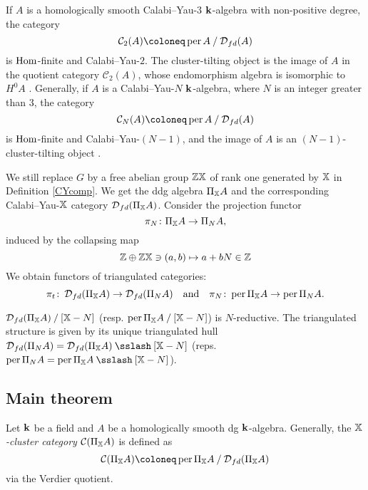 \begin{remark}
  If $A$ is a homologically smooth Calabi--Yau-$3$ $\mathbf{k}$-algebra
  with non-positive degree, the category
  \[ \mathcal{C}_2(A) \coloneq \per A \quot \D_{fd}(A)\]
  is $\operatorname{Hom}$-finite and Calabi--Yau-$2$.
  The cluster-tilting object is the image of $A$
  in the quotient category $\mathcal{C}_2(A)$,
  whose endomorphism algebra is isomorphic to $H^0A$ \cite[Theorem 2.1]{A}.
  Generally, if $A$ is a Calabi--Yau-$N$ $\mathbf{k}$-algebra,
  where $N$ is an integer greater than $3$,
  the category
  \[ \mathcal{C}_N(A) \coloneq \per A \quot \D_{fd}(A)\]
  is $\operatorname{Hom}$-finite and Calabi--Yau-$(N-1)$,
  and the image of $A$ is an $(N-1)$-cluster-tilting object \cite[Theorem 2.2]{Guo}.
\end{remark}
We still replace $G$ by a free abelian group $\mathbb{Z}\mathbb{X}$ of rank one
generated by $\mathbb{X}$ in Definition \ref{CYcomp}.
We get the ddg algebra $\Pi_{\mathbb{X}}A$
and the corresponding Calabi--Yau-$\mathbb{X}$ category $\operatorname{\mathcal{D}}_{fd}(\Pi_{\mathbb{X}}A)$.
Consider the projection functor
\[ \pi_N \colon \Pi_{\mathbb{X}}A \to \Pi_NA, \]
induced by the collapsing map
\[ \mathbb{Z} \oplus \mathbb{Z} \mathbb{X} \ni (a, b) \mapsto a + bN \in \mathbb{Z}\]
We obtain functors of triangulated categories:
\[
  \pi_t \colon \operatorname{\mathcal{D}}_{fd}(\Pi_{\mathbb{X}}A) \to \operatorname{\mathcal{D}}_{fd}(\Pi_NA)
  \quad \text{and} \quad
  \pi_N \colon \operatorname{per}\Pi_{\mathbb{X}}A \to \operatorname{per}\Pi_NA.
\]
\begin{proposition}\cite{Q1}
  $\operatorname{\mathcal{D}}_{fd}(\Pi_{\mathbb{X}}A) \mathbin{/} [\mathbb{X}-N]$ (resp. $\operatorname{per}\Pi_{\mathbb{X}}A \mathbin{/} [\mathbb{X}-N]$) is $N$-reductive.
  The triangulated structure is given by its unique triangulated hull
  $\D_{fd}(\Pi_NA) = \D_{fd}(\Pi_{\XX}A) \quott [\XX-N]$
  (reps. $\per\Pi_NA = \per\Pi_{\XX}A \quott [\XX-N]$).
\end{proposition}

\subsection{Main theorem}
\begin{definition}
  Let $\mathbf{k}$ be a field and $A$ be a homologically smooth dg $\mathbf{k}$-algebra.
  Generally, the \textit{$\mathbb{X}$-cluster category} $\operatorname{\mathcal{C}}(\Pi_{\mathbb{X}}A)$
  is defined as
  \[
    \Ce(\Pi_{\XX}A)
    \coloneq \per \Pi_{\XX}A \quot \D_{fd}(\Pi_{\XX}A)
  \]
  via the Verdier quotient.
\end{definition}

